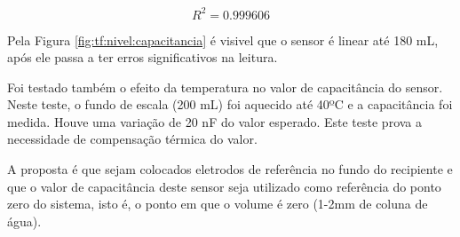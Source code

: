 \documentclass[a4paper]{instrumentacao}
\begin{document}
\begin{equation}
	R^2 = 0.999606
	\label{eq:tf:nivel:capacitancia-r2}
\end{equation}

Pela Figura \ref{fig:tf:nivel:capacitancia} é visivel que o sensor é linear até 180 mL, após ele passa a ter erros significativos na leitura.

Foi testado também o efeito da temperatura no valor de capacitância do sensor. Neste teste, o fundo de escala (200 mL) foi aquecido até 40ºC e a capacitância foi medida. Houve uma variação de 20 nF do valor esperado. Este teste prova a necessidade de compensação térmica do valor.

A proposta é que sejam colocados eletrodos de referência no fundo do recipiente e que o valor de capacitância deste sensor seja utilizado como referência do ponto zero do sistema, isto é, o ponto em que o volume é zero (1-2mm de coluna de água).
\end{document}
